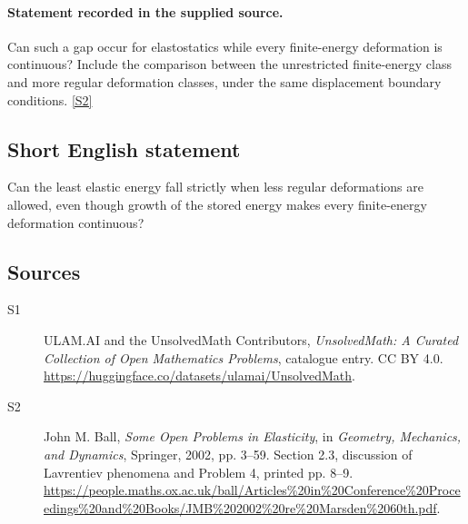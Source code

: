 \documentclass[11pt]{book}
\newcommand{\sref}[2]{\hyperlink{source:#1:#2}{[S#2]}}
\begin{document}
\paragraph{Statement recorded in the supplied source.}
Can such a gap occur for elastostatics while every finite-energy deformation is continuous? Include the comparison between the unrestricted finite-energy class and more regular deformation classes, under the same displacement boundary conditions. \sref{statement}{2}
\subsection{Short English statement}
Can the least elastic energy fall strictly when less regular deformations are allowed, even though growth of the stored energy makes every finite-energy deformation continuous?
\subsection{Sources}
\begin{description}
\item[\hypertarget{source:statement:1}{S1}] ULAM.AI and the UnsolvedMath Contributors, \emph{UnsolvedMath: A Curated Collection of Open Mathematics Problems}, catalogue entry. CC BY 4.0. \url{https://huggingface.co/datasets/ulamai/UnsolvedMath}.
\item[\hypertarget{source:statement:2}{S2}] John M. Ball, \emph{Some Open Problems in Elasticity}, in \emph{Geometry, Mechanics, and Dynamics}, Springer, 2002, pp. 3--59. Section 2.3, discussion of Lavrentiev phenomena and Problem 4, printed pp. 8--9. \url{https://people.maths.ox.ac.uk/ball/Articles%20in%20Conference%20Proceedings%20and%20Books/JMB%202002%20re%20Marsden%2060th.pdf}.
\end{description}
\label{end:statement}
\end{document}
